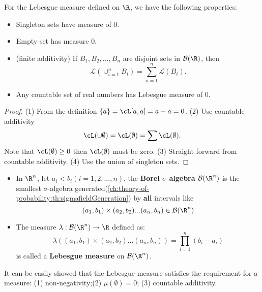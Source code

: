 \begin{refsection}
\begin{lemma}
For the Lebesgue measure defined on $\R$, we have the following properties:
\begin{itemize}
	\item Singleton sets have measure of 0.
	\item Empty set has measure 0.
	\item (finite additivity)
	 If $B_1,B_2,...,B_n$ are disjoint sets in $\mathcal{B}(\R)$, then
	$$\mathcal{L}(\cup_{i=1}^n B_i) = \sum_{n=1}^n \mathcal{L}(B_i).$$
	\item Any countable set of real numbers has Lebesgue measure of 0.
\end{itemize}	
\end{lemma}
\begin{proof}
(1) From the definition $\{a\} = \cL[a,a] = a-a = 0$. (2) Use countable additivity $$\cL(\cup \emptyset) = \cL(\emptyset) = \sum \cL(\emptyset).$$
Note that $\cL(\emptyset) \geq 0$ then $\cL(\emptyset)$ must be zero.
(3) Straight forward from countable additivity. (4) Use the union of singleton sets.	
\end{proof}

\begin{definition}\cite{fries2007mathematical} \label{ch:calculus:def:BorelAlgebraLebesgueMeasureonR}
	\begin{itemize}
		\item In $\R^n$, let $a_i < b_i (i=1,2,...,n)$, the \textbf{Borel $\sigma$ algebra} $\mathcal{B}(\R^n)$ is the smallest $\sigma$-algebra generated(\autoref{ch:theory-of-probability:th:sigmafieldGeneration}) by
		\textbf{all} intervals like $$(a_1,b_1)\times (a_2,b_2)...(a_n,b_n)\in \mathcal{B}(\R^n)$$
		\item The measure $\lambda:\mathcal{B}(\R^n)\rightarrow \R$ defined as:
		$$\lambda((a_1,b_1)\times (a_2,b_2)...(a_n,b_n)) = \prod_{i=1}^n (b_i-a_i)$$ is called a \textbf{Lebesgue measure} on $\mathcal{B}(\R^n)$.
	\end{itemize}	
\end{definition}

\begin{remark}
	It can be easily showed that the Lebesgue measure satisfies the requirement for a measure: (1) non-negativity;(2) $\mu(\emptyset) = 0$; (3) countable additivity.
\end{remark}


\end{refsection}
